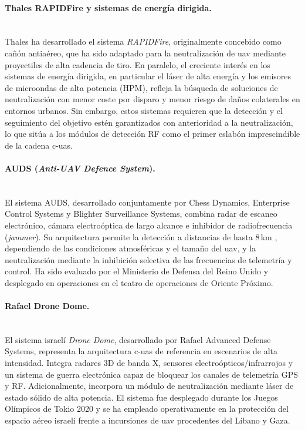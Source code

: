 \paragraph{Thales RAPIDFire y sistemas de energía dirigida.}\mbox{}\\[0.5em] Thales ha desarrollado el sistema \textit{RAPIDFire}, originalmente concebido como cañón antiaéreo, que ha sido adaptado para la neutralización de \gls{uav} mediante proyectiles de alta cadencia de tiro. En paralelo, el creciente interés en los sistemas de energía dirigida, en particular el láser de alta energía y los emisores de microondas de alta potencia (HPM), refleja la búsqueda de soluciones de neutralización con menor coste por disparo y menor riesgo de daños colaterales en entornos urbanos. Sin embargo, estos sistemas requieren que la detección y el seguimiento del objetivo estén garantizados con anterioridad a la neutralización, lo que sitúa a los módulos de detección RF como el primer eslabón imprescindible de la cadena \gls{c-uas}.

\paragraph{AUDS (\textit{Anti-UAV Defence System}).}\mbox{}\\[0.5em] El sistema AUDS, desarrollado conjuntamente por Chess Dynamics, Enterprise Control Systems y Blighter Surveillance Systems, combina radar de escaneo electrónico, cámara electroóptica de largo alcance e inhibidor de radiofrecuencia (\textit{jammer}). Su arquitectura permite la detección a distancias de hasta 8\,km , dependiendo de las condiciones atmosféricas y el tamaño del \gls{uav}, y la neutralización mediante la inhibición selectiva de las frecuencias de telemetría y control. Ha sido evaluado por el Ministerio de Defensa del Reino Unido y desplegado en operaciones en el teatro de operaciones de Oriente Próximo.

\paragraph{Rafael Drone Dome.}\mbox{}\\[0.5em] El sistema israelí \textit{Drone Dome}, desarrollado por Rafael Advanced Defense Systems, representa la arquitectura \gls{c-uas} de referencia en escenarios de alta intensidad. Integra radares 3D de banda X, sensores electroópticos/infrarrojos y un sistema de guerra electrónica capaz de bloquear los canales de telemetría GPS y RF. Adicionalmente, incorpora un módulo de neutralización mediante láser de estado sólido de alta potencia. El sistema fue desplegado durante los Juegos Olímpicos de Tokio 2020 y se ha empleado operativamente en la protección del espacio aéreo israelí frente a incursiones de \gls{uav} procedentes del Líbano y Gaza.


